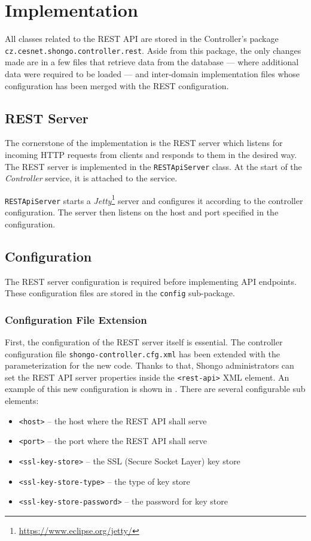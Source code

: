 \chapter{Implementation}
All classes related to the REST API are stored in the Controller’s package  \texttt{cz.cesnet.shongo.controller.rest}.
Aside from this package, the only changes made are in a few files that retrieve data from the database --- where additional data were required to be loaded --- and inter-domain implementation files\cite{pavelka2016shongo} whose configuration has been merged with the REST configuration.

\section{REST Server}
The cornerstone of the implementation is the REST server which listens for incoming HTTP requests from clients and responds to them in the desired way. The REST server is implemented in the \texttt{RESTApiServer} class.
At the start of the \emph{Controller} service, it is attached to the service.

\texttt{RESTApiServer} starts a \emph{Jetty}\footnote{\url{https://www.eclipse.org/jetty/}} server and configures it according to the controller configuration. The server then listens on the host and port specified in the configuration.

\section{Configuration}
The REST server configuration is required before implementing API endpoints. These configuration files are stored in the \texttt{config} sub-package.

\subsection{Configuration File Extension}
First, the configuration of the REST server itself is essential. The controller configuration file \texttt{shongo-controller.cfg.xml} has been extended with the parameterization for the new code. Thanks to that, Shongo administrators can set the REST API server properties inside the \texttt{<rest-api>} XML element. An example of this new configuration is shown in . There are several configurable sub elements:
\begin{itemize}
    \item \texttt{<host>} -- the host where the REST API shall serve
    \item \texttt{<port>} -- the port where the REST API shall serve
    \item \texttt{<ssl-key-store>} -- the SSL (Secure Socket Layer) key store
    \item \texttt{<ssl-key-store-type>} -- the type of key store
    \item \texttt{<ssl-key-store-password>} -- the password for key store
\end{itemize}

